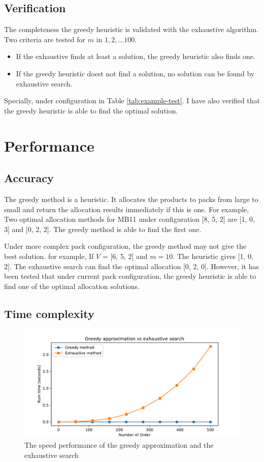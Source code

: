 \documentclass[a4paper]{article}
\begin{document}
\subsection{Verification}

The completeness the greedy heuristic is validated with the exhaustive algorithm. Two criteria are tested for $m$ in $1, 2, ... 100$.
\begin{itemize}
\item If the exhaustive finds at least a solution, the greedy heuristic also finds one. \item If the greedy heuristic doest not find a solution, no solution can be found by exhaustive search.
\end{itemize}

Specially, under configuration in Table {\ref{tab:example-test}}. I have also verified that the greedy heuristic is able to find the optimal solution.


\section{Performance}

\subsection{Accuracy}

The greedy method is a heuristic. It allocates the products to packs from large to small and return the allocation results immediately if this is one. For example, Two optimal allocation methods for MB11 under configuration [8, 5, 2] are [1, 0, 3] and [0, 2, 2]. The greedy method is able to find the first one.

Under more complex pack configuration, the greedy method may not give the best solution. for example, If $V$ = [6, 5, 2] and $m=10$. The heuristic gives [1, 0, 2]. The exhaustive search can find the optimal allocation [0, 2, 0]. However, it has been tested that under current pack configuration, the greedy heuristic is able to find one of the optimal allocation solutions.

\subsection{Time complexity}

\begin{figure}
\label{fig:comparison}
    \includegraphics[width=\textwidth]{./comparison.pdf}
    \caption{The speed performance of the greedy approximation and the exhaustive search}
\end{figure}
\end{document}
